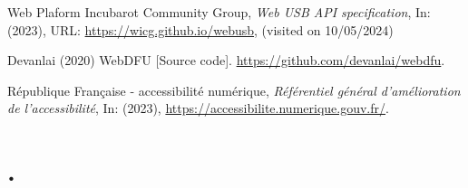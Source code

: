 \documentclass[francais]{rapportPFE}  %
\begin{document}
\begin{thebibliography}{9}
    
        Web Plaform Incubarot Community Group,
        \textit{Web USB API specification},
        In: (2023),
        URL: \url{https://wicg.github.io/webusb},
        (visited on 10/05/2024)

    
    
    
        Devanlai (2020) WebDFU [Source code]. \url{https://github.com/devanlai/webdfu}.


    
    République Française - accessibilité numérique,
    \textit{Référentiel général d’amélioration de l’accessibilité},
    In: (2023),
    \url{https://accessibilite.numerique.gouv.fr/}.
        
\end{thebibliography}

\appendix
\section{.}
\end{document}
